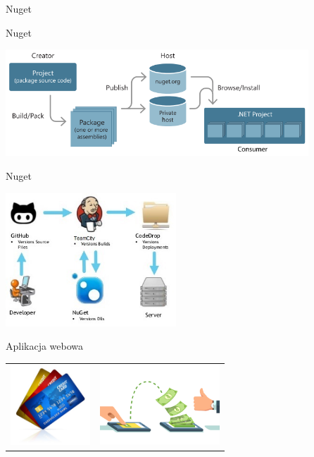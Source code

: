 \documentclass{beamer}
\begin{document}
\begin{frame}{}
	\begin{center}
		\Huge{Nuget}
	\end{center}
\end{frame}

\begin{frame}{Nuget}
	\begin{center}
  		\includegraphics[height=4cm]{nuget1.png}
	\end{center}
\end{frame}

\begin{frame}{Nuget}
	\begin{center}
  		\includegraphics[height=5cm]{nuget2.jpg}
	\end{center}
\end{frame}


\begin{frame}{Aplikacja webowa}
	\begin{center}
		\begin{tabular}{ m{5cm} m{5cm} }
  			\includegraphics[height=3cm]{card3.jpg} & \includegraphics[height=3cm]{przelew1.jpg}
		\end{tabular}
	\end{center}
\end{frame}
\end{document}
